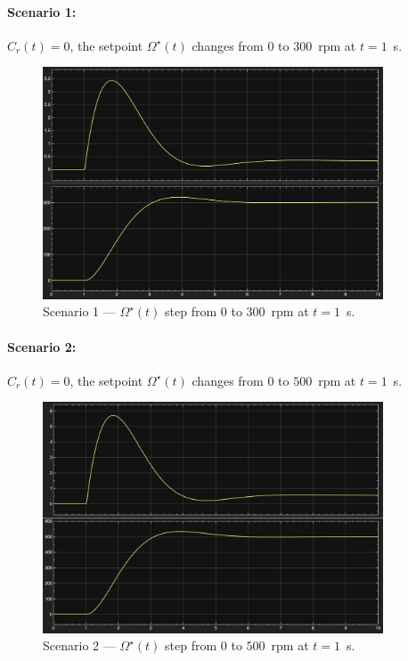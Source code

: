 \documentclass{rapportCS}
\begin{document}
\paragraph{Scenario 1:} $C_r(t)=0$, the setpoint $\Omega^\star(t)$ changes from $0$ to $300$~rpm at $t=1$~s.
\begin{figure}[H]
\centering
\includegraphics[width=0.9\textwidth]{figures/simulink3.png}
\caption{Scenario 1 — $\Omega^\star(t)$ step from $0$ to $300$~rpm at $t=1$~s.}
\label{fig:simulink3}
\end{figure}

\paragraph{Scenario 2:} $C_r(t)=0$, the setpoint $\Omega^\star(t)$ changes from $0$ to $500$~rpm at $t=1$~s.
\begin{figure}[H]
\centering
\includegraphics[width=0.9\textwidth]{figures/simulink4.png}
\caption{Scenario 2 — $\Omega^\star(t)$ step from $0$ to $500$~rpm at $t=1$~s.}
\label{fig:simulink4}
\end{figure}
\end{document}
